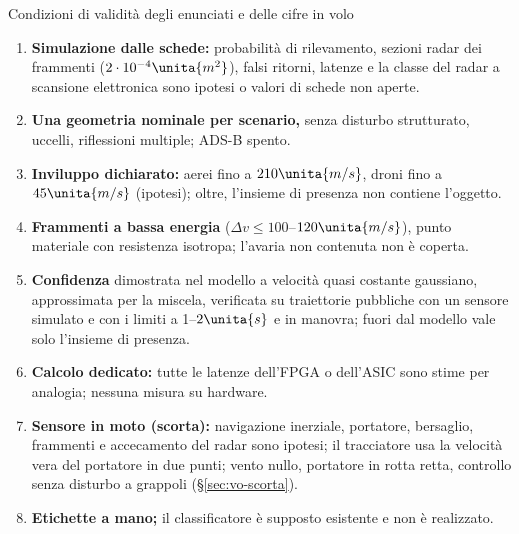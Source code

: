 \begin{riquadro}{Condizioni di validità degli enunciati e delle cifre in volo}
\begin{enumerate}[label=\arabic*.,itemsep=1pt]
\item \textbf{Simulazione dalle schede:} probabilità di rilevamento, sezioni radar dei frammenti ($2\cdot10^{-4}\unita{m^2}$), falsi ritorni, latenze e la classe del radar a scansione elettronica sono ipotesi o valori di schede non aperte.
\item \textbf{Una geometria nominale per scenario,} senza disturbo strutturato, uccelli, riflessioni multiple; ADS-B spento.
\item \textbf{Inviluppo dichiarato:} aerei fino a $210\unita{m/s}$, droni fino a $45\unita{m/s}$ (ipotesi); oltre, l'insieme di presenza non contiene l'oggetto.
\item \textbf{Frammenti a bassa energia} ($\Delta v\le100$--$120\unita{m/s}$), punto materiale con resistenza isotropa; l'avaria non contenuta non è coperta.
\item \textbf{Confidenza} dimostrata nel modello a velocità quasi costante gaussiano, approssimata per la miscela, verificata su traiettorie pubbliche con un sensore simulato e con i limiti a 1--$2\unita{s}$ e in manovra; fuori dal modello vale solo l'insieme di presenza.
\item \textbf{Calcolo dedicato:} tutte le latenze dell'FPGA o dell'ASIC sono stime per analogia; nessuna misura su hardware.
\item \textbf{Sensore in moto (scorta):} navigazione inerziale, portatore, bersaglio, frammenti e accecamento del radar sono ipotesi; il tracciatore usa la velocità vera del portatore in due punti; vento nullo, portatore in rotta retta, controllo senza disturbo a grappoli (\S\ref{sec:vo-scorta}).
\item \textbf{Etichette a mano;} il classificatore è supposto esistente e non è realizzato.
\end{enumerate}
\end{riquadro}
